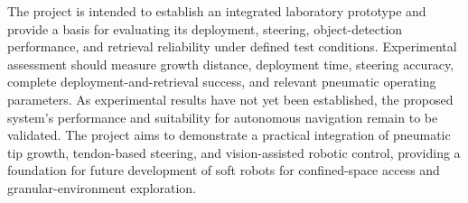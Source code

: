 The project is intended to establish an integrated laboratory prototype and provide a basis for evaluating its deployment, steering, object-detection performance, and retrieval reliability under defined test conditions. Experimental assessment should measure growth distance, deployment time, steering accuracy, complete deployment-and-retrieval success, and relevant pneumatic operating parameters. As experimental results have not yet been established, the proposed system's performance and suitability for autonomous navigation remain to be validated. The project aims to demonstrate a practical integration of pneumatic tip growth, tendon-based steering, and vision-assisted robotic control, providing a foundation for future development of soft robots for confined-space access and granular-environment exploration.

\clearpage

